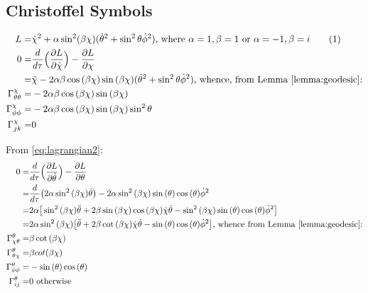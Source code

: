 \documentclass[]{article}
\newcommand\numberthis{\addtocounter{equation}{1}\tag{\theequation}}
\begin{document}
\subsection{Christoffel Symbols} \label{section:christoffel2}

\begin{align*}
L=&\dot{\chi}^2 + \alpha \sin^2(\beta \chi)(\dot\theta^2 + \sin^2 \theta \dot \phi^2)\text{, where $\alpha=1,\beta=1$ or $\alpha=-1,\beta=i$} \numberthis \label{eq:lagrangian2}\\
0=&\frac{d}{d \tau}\Big(\frac{\partial L}{\partial \dot{\chi}}\Big)-\frac{\partial L}{\partial \chi}\\
=&\ddot{\chi}-2\alpha\beta \cos{(\beta\chi)}\sin{(\beta\chi)}(\dot\theta^2 + \sin^2 \theta \dot \phi^2)\text{, whence, from Lemma \ref{lemma:geodesic}:}\\
\Gamma^{\chi}_{\theta\theta}=&-2\alpha\beta \cos{(\beta\chi)}\sin{(\beta\chi)}\\
\Gamma^{\chi}_{\phi\phi}=&-2\alpha\beta \cos{(\beta\chi)}\sin{(\beta\chi)}\sin^2 \theta\\
\Gamma^{\chi}_{jk}=&0
\end{align*}

From \eqref{eq:lagrangian2}:
\begin{align*}
0=&\frac{d}{d \tau}\Big(\frac{\partial L}{\partial \dot{\theta}}\Big)-\frac{\partial L}{\partial \theta}\\
=&\frac{d}{d \tau}\big(2\alpha\sin^2{(\beta\chi)}\dot{\theta}\big)-2\alpha\sin^2{(\beta\chi)}\sin{(\theta)}\cos{(\theta)}\dot{\phi}^2\\
=&2\alpha\big[\sin^2{(\beta\chi)}\ddot{\theta}+2\beta\sin{(\beta\chi)}\cos{(\beta\chi)}\dot{\chi}\dot{\theta}-\sin^2{(\beta\chi)}\sin{(\theta)}\cos{(\theta)}\dot{\phi}^2\big]\\
=&2\alpha\sin^2{(\beta\chi)}\big[\ddot{\theta}+2\beta \cot{(\beta\chi)}\dot{\chi}\dot{\theta}-\sin{(\theta)}\cos{(\theta)}\dot{\phi}^2\big]\text{, whence from Lemma \ref{lemma:geodesic}:}\\
\Gamma^{\theta}_{\chi\theta}=&\beta\cot{(\beta\chi)}\\
\Gamma^{\theta}_{\theta\chi}=&\beta cot{(\beta\chi)}\\
\Gamma^{\theta}_{\phi\phi}=&-\sin{(\theta)}\cos{(\theta)}\\
\Gamma^{\theta}_{ij}=&0\text{ otherwise}
\end{align*}
\end{document}

